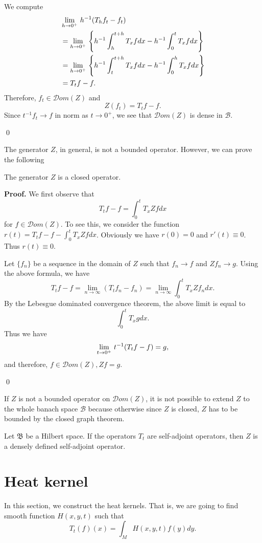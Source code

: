 We compute
\begin{align*}
& \lim_{h\to 0^+}\, h^{-1} (T_hf_t-f_t)\\
&=\lim_{h\to 0^+}\,\left\{ h^{-1}\int_h^{t+h}T_xf dx-h^{-1}\int_0^t T_x f dx\right\}\\
&=\lim_{h\to 0^+}\, \left\{ h^{-1}\int_t^{t+h}T_x f dx-h^{-1}\int_0^h T_x f dx\right\}\\
&=T_t f-f.
\end{align*}
Therefore, $f_t\in{\mathcal Dom}(Z)$ and 
\[
Z(f_t)=T_t f-f.
\]
Since $t^{-1} f_t\to f$ in norm as $t\to 0^+$, we see that ${\mathcal Dom}(Z)$ is dense in $\mathcal B$.


\qed

The generator $Z$, in general, is not a bounded operator. However, we can prove the following





\begin{lemma} The generator $Z$ is a closed operator.
\end{lemma}

{\bf Proof.}
We first observe that 
\[
T_tf-f=\int_0^t T_x Zf dx
\]
for  $f\in{\mathcal Dom}(Z)$. To see this, we consider the function $r(t)=T_tf-f-\int_0^t T_x Zf dx$. Obviously we have $r(0)=0$ and $r'(t)\equiv 0$. Thus $r(t)\equiv 0$.

Let $\{f_n\}$ be a sequence in the domain of $Z$ such that $f_n\to f$ and $Zf_n\to g$.
Using the above formula, we have
\[
T_t f-f=\lim_{n\to \infty} (T_t f_n -f_n)
=\lim_{n\to \infty}\int_0^t T_x Zf_n dx.
\]
By the Lebesgue dominated convergence theorem, the above limit is equal to 
\[
\int_0^t T_x g dx.
\]
Thus we have
\[
\lim_{t\to 0^+}\, t^{-1}(T_t f-f)=g,
\]
and therefore, $f\in{\mathcal Dom}(Z), Zf=g$.

\qed


\begin{remark}
If $Z$ is not a bounded operator on ${\mathcal Dom}(Z)$, it is not possible to extend $Z$ to the whole banach space $\mathcal B$ because otherwise since $Z$ is closed, $Z$ has to be bounded by the closed graph theorem.
\end{remark}


\begin{theorem}
Let $\mathfrak B$ be a Hilbert space. If the operators $T_t$ are self-adjoint operators, then $Z$ is a densely defined self-adjoint operator. 
\end{theorem}



\section{Heat kernel}
In this section, we construct the heat kernels. That is, we are going to find smooth function $H(x,y,t)$ such that
\[
T_t(f)(x)=\int_M H(x,y,t) f(y) dy.
\]

